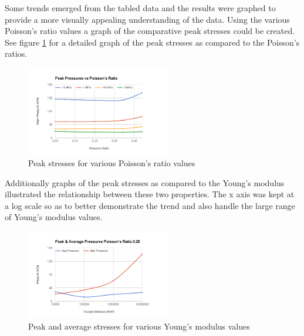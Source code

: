 \documentclass[conference]{IEEEtran}
\begin{document}
Some trends emerged from the tabled data and the results were graphed to provide a more visually appealing understanding of the data. Using the various Poisson's ratio values a graph of the comparative peak stresses could be created. See figure \ref{peakstressPR} for a detailed graph of the peak stresses as compared to the Poisson's ratios.

\begin{figure}[!t]
\centering
 \includegraphics[width=2.5in]{pics/PeakPressurePR.png}
    \caption{Peak stresses for various Poisson's ratio values}
    \label{peakstressPR}
\end{figure}

Additionally graphs of the peak stresses as compared to the Young's modulus illustrated the relationship between these two properties. The x axis was kept at a log scale so as to better demonstrate the trend and also handle the large range of Young's modulus values. 

\begin{figure}[!t]
\centering
 \includegraphics[width=2.5in]{pics/PeakPressureYM.png}
    \caption{Peak and average stresses for various Young's modulus values}
    \label{peakstressYM}
\end{figure}
\end{document}
